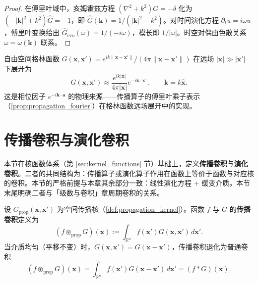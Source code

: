 \begin{proof}
在傅里叶域中，亥姆霍兹方程 $(\nabla^2+k^2)G = -\delta$ 化为 $(-|\mathbf{k}|^2+k^2)\hat G = -1$，即 $\hat G(\mathbf{k}) = 1/(|\mathbf{k}|^2-k^2)$。对时间演化方程 $\partial_t u = i\omega u$，傅里叶变换给出 $\hat G_{\text{evo}}(\omega) = 1/(-i\omega)$，模长即 $1/|\omega|$。时空对偶由色散关系 $\omega = \omega(\mathbf{k})$ 联系。
\end{proof}

\begin{example}[自由空间格林函数的远场展开]\label{ex:green_far_field}
自由空间格林函数 $G(\mathbf{x},\mathbf{x}') = e^{ik\|\mathbf{x}-\mathbf{x}'\|}/(4\pi\|\mathbf{x}-\mathbf{x}'\|)$ 在远场 $|\mathbf{x}|\gg|\mathbf{x}'|$ 下展开为
\[
G(\mathbf{x},\mathbf{x}') \approx \frac{e^{ik|\mathbf{x}|}}{4\pi|\mathbf{x}|}e^{-i\mathbf{k}\cdot\mathbf{x}'}, \qquad \mathbf{k} = k\hat{\mathbf{x}}.
\]
这是相位因子 $e^{-i\mathbf{k}\cdot\mathbf{a}}$ 的物理来源——传播算子的傅里叶乘子表示（\cref{prop:propagation_fourier}）在格林函数远场展开中的实现。
\end{example}

\section{传播卷积与演化卷积}\label{sec:propagation_convolution}

\begin{remark}[本节定位]\label{rem:convolution_section_positioning}
本节在核函数体系（第 \ref{sec:kernel_functions} 节）基础上，定义\textbf{传播卷积}与\textbf{演化卷积}。二者的共同结构为：传播算子或演化算子作用在函数上等价于函数与对应核的卷积。本节的严格前提与本章其余部分一致：线性演化方程 + 缓变介质。本节末尾明确二者与「级数与卷积」章周期卷积的关系。
\end{remark}

\begin{definition}[传播卷积]\label{def:propagation_convolution}
设 $G_{\text{prop}}(\mathbf{x},\mathbf{x}')$ 为空间传播核（\cref{def:propagation_kernel}）。函数 $f$ 与 $G$ 的\textbf{传播卷积}定义为
\[
(f \circledast_{\text{prop}} G)(\mathbf{x}) := \int_{\mathbb{R}^n}f(\mathbf{x}')G(\mathbf{x},\mathbf{x}')\,d\mathbf{x}'.
\]
当介质均匀（平移不变）时，$G(\mathbf{x},\mathbf{x}') = G(\mathbf{x}-\mathbf{x}')$，传播卷积退化为普通卷积
\[
(f \circledast_{\text{prop}} G)(\mathbf{x}) = \int_{\mathbb{R}^n}f(\mathbf{x}')G(\mathbf{x}-\mathbf{x}')\,d\mathbf{x}' = (f * G)(\mathbf{x}).
\]
\end{definition}

